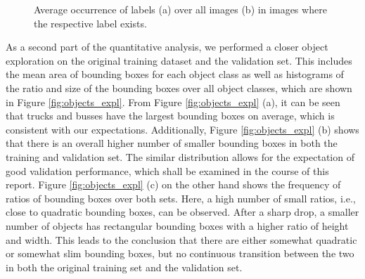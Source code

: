 \documentclass{article}
\begin{document}
\begin{figure}[t!]
    \centering
    \caption{Average occurrence of labels (a) over all images (b) in images where the respective label exists.}
    \label{fig:occurrence}
\end{figure}

As a second part of the quantitative analysis, we performed a closer object exploration on the original training dataset and the validation set. This includes the mean area of bounding boxes for each object class as well as histograms of the ratio and size of the bounding boxes over all object classes, which are shown in Figure \ref{fig:objects_expl}. From Figure \ref{fig:objects_expl} (a), it can be seen that trucks and busses have the largest bounding boxes on average, which is consistent with our expectations. Additionally, Figure \ref{fig:objects_expl} (b) shows that there is an overall higher number of smaller bounding boxes in both the training and validation set. The similar distribution allows for the expectation of good validation performance, which shall be examined in the course of this report. Figure \ref{fig:objects_expl} (c) on the other hand shows the frequency of ratios of bounding boxes over both sets. Here, a high number of small ratios, i.e., close to quadratic bounding boxes, can be observed. After a sharp drop, a smaller number of objects has rectangular bounding boxes with a higher ratio of height and width. This leads to the conclusion that there are either somewhat quadratic or somewhat slim bounding boxes, but no continuous transition between the two in both the original training set and the validation set.
\end{document}
